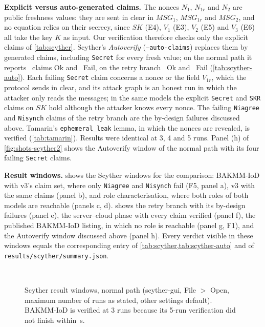 \textbf{Explicit versus auto-generated claims.} The nonces $N_1$, $N_{1r}$ and $N_2$ are public freshness values: they are
sent in clear in $MSG_1$, $MSG_{1r}$ and $MSG_2$, and no equation relies on their secrecy, since $SK$ (E4), $V_1$ (E3), $V_2$ (E5)
and $V_3$ (E6) all take the key $K$ as input. Our verification therefore checks only the explicit claims of
\cref{tab:scyther}. Scyther's \emph{Autoverify} (\texttt{--auto-claims}) replaces them by generated claims, including
\texttt{Secret} for every fresh value; on the normal path it reports \ScyAutoNormalAutoOk\ claims Ok and
\ScyAutoNormalAutoFail\ Fail, on the retry branch \ScyAutoRetryAutoOk\ Ok and \ScyAutoRetryAutoFail\ Fail
(\cref{tab:scyther-auto}). Each failing \texttt{Secret} claim concerns a nonce or the field $V_{1r}$, which the protocol sends
in clear, and its attack graph is an honest run in which the attacker only reads the messages; in the same models the explicit
\texttt{Secret} and \texttt{SKR} claims on $SK$ hold although the attacker knows every nonce. The failing \texttt{Niagree} and
\texttt{Nisynch} claims of the retry branch are the by-design failures discussed above. Tamarin's \texttt{ephemeral\_leak}
lemma, in which the nonces are revealed, is verified (\cref{tab:tamarin}). Results were identical at 3, 4 and 5 runs.
Panel (h) of \cref{fig:shots-scyther2} shows the Autoverify window of the normal path with its four failing \texttt{Secret}
claims.


\textbf{Result windows.}  shows the Scyther windows for the comparison: BAKMM-IoD with v3's claim set,
where only \texttt{Niagree} and \texttt{Nisynch} fail (F5, panel a), v3 with the same claims (panel b), and role
characterisation, where both roles of both models are reachable (panels c, d).  shows the retry branch
with its by-design failures (panel e), the server--cloud phase with every claim verified (panel f), the published BAKMM-IoD
listing, in which no role is reachable (panel g, F1), and the Autoverify window discussed above (panel h). Every verdict
visible in these windows equals the corresponding entry of \cref{tab:scyther,tab:scyther-auto} and of
\texttt{results/scyther/summary.json}.

\begin{figure}[!t]
\centering
{}\hfill
{}\\[4pt]
\hfill
{}
\caption{Scyther result windows, normal path (scyther-gui, File $>$ Open, maximum number of runs as stated, other settings
default). BAKMM-IoD is verified at 3 runs because its 5-run verification did not finish within \ScyBakmmFiveSecs\,s.}
\label{fig:shots-scyther}
\end{figure}

